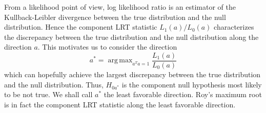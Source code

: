\documentclass[12pt]{article} %
\DeclareMathOperator*{\argmax}{arg\,max}
\theoremstyle{definition}
\begin{document}
From a likelihood point of view, log likelihood ratio is an estimator of the Kullback-Leibler divergence between the true distribution and the null distribution.
Hence the component LRT statistic $L_1(a)/L_0(a)$ characterizes the discrepancy between  the true distribution and the null distribution along the direction $a$.
This motivates us to consider the direction 
\begin{equation}\label{LFDdef1}
    a^*=\argmax_{a^T a=1}\frac{L_1(a)}{L_0(a)}
\end{equation}
which can hopefully achieve the largest discrepancy between the true distribution and the null distribution.
Thus, $H_{0a^*}$ is the component null hypothesis most likely to be not true.
We shall call $a^*$ the least favorable direction. %
Roy's maximum root is in fact the component LRT statistic along the least favorable direction.




\end{document}
